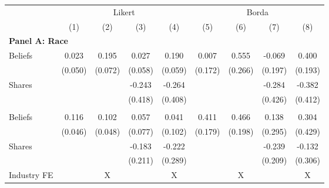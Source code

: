 \begin{tabular}{lcccccccc}
\toprule
 & \multicolumn{4}{c}{Likert} & \multicolumn{4}{c}{Borda} \\
\cmidrule(lr){2-5} \cmidrule(lr){6-9}
 & (1) & (2) & (3) & (4) & (5) & (6) & (7) & (8)
\\
\midrule
\multicolumn{9}{l}{\textbf{Panel A: Race}} \\
Beliefs & 0.023 & 0.195 & 0.027 & 0.190 & 0.007 & 0.555 & -0.069 & 0.400
\\
 & (0.050) & (0.072) & (0.058) & (0.059) & (0.172) & (0.266) & (0.197) & (0.193)
\\
Shares &  &  & -0.243 & -0.264 &  &  & -0.284 & -0.382
\\
 &  &  & (0.418) & (0.408) &  &  & (0.426) & (0.412)
\\
\addlinespace
\multicolumn{9}{l}{\textbf{Panel B: Gender}} \\
Beliefs & 0.116 & 0.102 & 0.057 & 0.041 & 0.411 & 0.466 & 0.138 & 0.304
\\
 & (0.046) & (0.048) & (0.077) & (0.102) & (0.179) & (0.198) & (0.295) & (0.429)
\\
Shares &  &  & -0.183 & -0.222 &  &  & -0.239 & -0.132
\\
 &  &  & (0.211) & (0.289) &  &  & (0.209) & (0.306)
\\
\addlinespace
Industry FE &  & X &  & X &  & X &  & X
\\
\bottomrule
\end{tabular}
